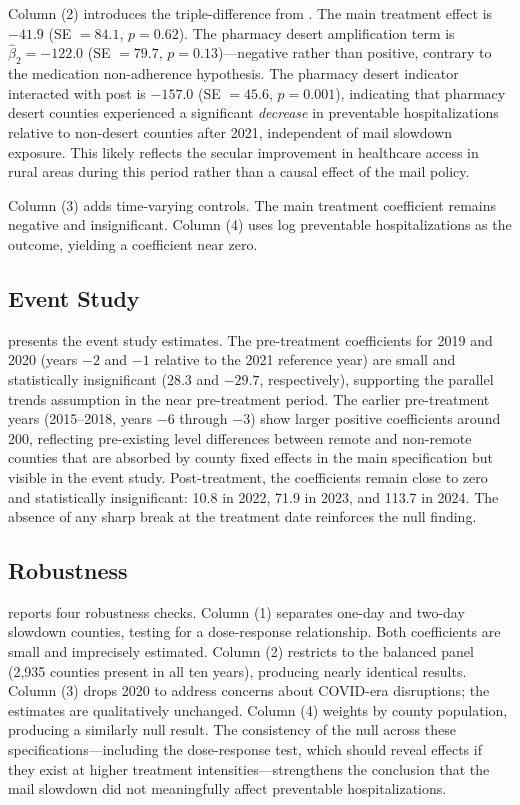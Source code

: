 \documentclass[12pt]{article}
\begin{document}
Column (2) introduces the triple-difference from . The main treatment effect is $-41.9$ (SE $= 84.1$, $p = 0.62$). The pharmacy desert amplification term is $\hat{\beta}_2 = -122.0$ (SE $= 79.7$, $p = 0.13$)---negative rather than positive, contrary to the medication non-adherence hypothesis. The pharmacy desert indicator interacted with post is $-157.0$ (SE $= 45.6$, $p = 0.001$), indicating that pharmacy desert counties experienced a significant \textit{decrease} in preventable hospitalizations relative to non-desert counties after 2021, independent of mail slowdown exposure. This likely reflects the secular improvement in healthcare access in rural areas during this period rather than a causal effect of the mail policy.

Column (3) adds time-varying controls. The main treatment coefficient remains negative and insignificant. Column (4) uses log preventable hospitalizations as the outcome, yielding a coefficient near zero.

\begingroup\footnotesize\endgroup

\subsection{Event Study}

 presents the event study estimates. The pre-treatment coefficients for 2019 and 2020 (years $-2$ and $-1$ relative to the 2021 reference year) are small and statistically insignificant (28.3 and $-29.7$, respectively), supporting the parallel trends assumption in the near pre-treatment period. The earlier pre-treatment years (2015--2018, years $-6$ through $-3$) show larger positive coefficients around 200, reflecting pre-existing level differences between remote and non-remote counties that are absorbed by county fixed effects in the main specification but visible in the event study. Post-treatment, the coefficients remain close to zero and statistically insignificant: 10.8 in 2022, 71.9 in 2023, and 113.7 in 2024. The absence of any sharp break at the treatment date reinforces the null finding.



\subsection{Robustness}

 reports four robustness checks. Column (1) separates one-day and two-day slowdown counties, testing for a dose-response relationship. Both coefficients are small and imprecisely estimated. Column (2) restricts to the balanced panel (2,935 counties present in all ten years), producing nearly identical results. Column (3) drops 2020 to address concerns about COVID-era disruptions; the estimates are qualitatively unchanged. Column (4) weights by county population, producing a similarly null result. The consistency of the null across these specifications---including the dose-response test, which should reveal effects if they exist at higher treatment intensities---strengthens the conclusion that the mail slowdown did not meaningfully affect preventable hospitalizations.
\end{document}
